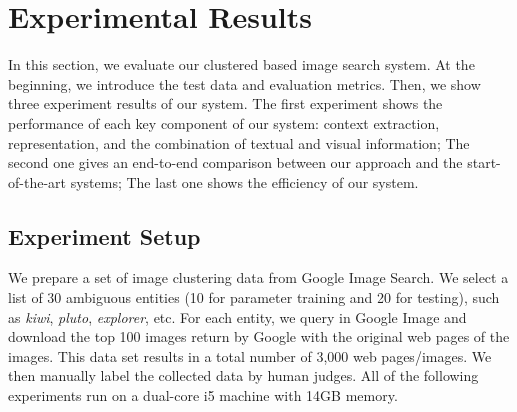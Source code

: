 \section{Experimental Results}
\label{sec:eval}
In this section, we evaluate our clustered based image search system.
At the beginning, we introduce the test data and evaluation metrics.
Then, we show three experiment results of our system.
The first experiment shows the performance of each key component
of our system: context extraction, representation, and
 the combination of textual and visual information;
The second one gives an end-to-end comparison between our
 approach and the start-of-the-art systems;
The last one shows the efficiency of our system.


\subsection{Experiment Setup}

We prepare a set of image clustering data from Google Image Search.
We select a list of 30 ambiguous entities
(10 for parameter training and 20 for testing),
such as \emph{kiwi}, \emph{pluto}, \emph{explorer}, etc.
For each entity, we query in Google Image and
download the top 100 images return by Google with the original web pages of the images.
This data set results in a total number of 3,000 web pages/images.
We then manually label the collected data by human judges.
All of the following experiments
run on a dual-core i5 machine with 14GB memory.


